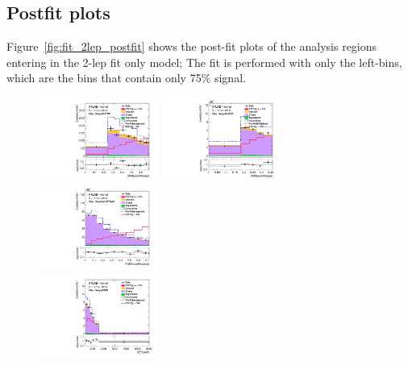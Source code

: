 \subsection{Postfit plots}
Figure~\ref{fig:fit_2lep_postfit} shows the post-fit plots of the analysis regions entering in the 2-lep fit only model;
The fit is performed with only the left-bins, which are the bins that contain only 75\% signal.

\begin{figure}[ht]
    \centering
    \includegraphics[width=0.35\textwidth]{figures/2lep/FitResults/Region_distRNNScoreMerged_DSRVBSHP_BMin0_J0_incJet1_L2_T0_incFat1_Y6051_incTag1_Fat1_GlobalFit_unconditionnal_mu1.pdf}
    \includegraphics[width=0.35\textwidth]{figures/2lep/FitResults/Region_distRNNScoreMerged_DSRVBSLP_BMin0_J0_incJet1_L2_T0_incFat1_Y6051_incTag1_Fat1_GlobalFit_unconditionnal_mu1.pdf}
    \includegraphics[width=0.35\textwidth]{figures/2lep/FitResults/Region_distRNNScoreResolved_DSRVBSFid_BMin0_T0_Y6051_incTag1_J2_L2_incJet1_GlobalFit_unconditionnal_mu1.pdf}
    \\
    \includegraphics[width=0.35\textwidth]{figures/2lep/FitResults/Region_distMTagMerJets_DCRVjet_BMin0_J0_incJet1_L2_T0_incFat1_Y6051_incTag1_Fat1_GlobalFit_unconditionnal_mu1.pdf}

\end{figure}
